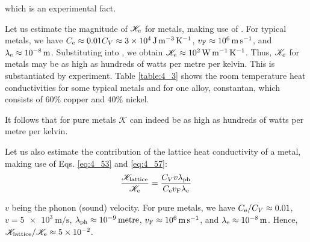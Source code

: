 \noindent
which is an experimental fact.

Let us estimate the magnitude of $\mathscr{K}_{\text{e}}$ for metals, making use of . For typical metals, we have $C_{\text{e}}\approx 0.01C_V\approx\SI{3e4}{\joule\per\metre\cubed\per\kelvin}$,
$v_{\text{F}}\approx\SI{e6}{\metre\per\second}$, and $\lambda_{\text{e}}\approx\SI{e-8}{\metre}$. Substituting into , we obtain $\mathscr{K}_{\text{e}}\approx\SI{e2}{\watt\per\metre\per\kelvin}$.
Thus, $\mathscr{K}_{\text{e}}$ for metals may be as high as hundreds of watts per metre per kelvin. This is substantiated by experiment. Table \ref{table:4_3} shows the room temperature heat conductivities for some typical metals and for one alloy, constantan, which consists of $60\%$ copper and $40\%$ nickel.

\begin{table}[!b]
	\renewcommand{\arraystretch}{1.2}
	\caption{}
	\vspace{-0.6cm}
	\label{table:4_3}
	\begin{center}\end{center}
\end{table}

It follows that for pure metals $\mathscr{K}$ can indeed be as high as hundreds of watts per metre per kelvin.

Let us also estimate the contribution of the lattice heat conductivity of a metal, making use of Eqs. \eqref{eq:4_53} and \eqref{eq:4_57}:
\begin{equation*}
    \frac{\mathscr{K}_{\text{lattice}}}{\mathscr{K}_{\text{e}}} = \frac{C_V v \lambda_{\text{ph}}}{C_{\text{e}} v_{\text{F}} \lambda_{\text{e}}}
\end{equation*}

\noindent
$v$ being the phonon (sound) velocity. For pure metals, we have $C_{\text{e}}/C_V\approx 0.01$, $v=\SI{5e3}{\metre\per\second}$, $\lambda_{\text{ph}}\approx\SI{e-9}{metre}$, $v_{\text{F}}\approx\SI{e6}{\metre\per\second}$, and $\lambda_{\text{e}}\approx\SI{e-8}{\metre}$.
Hence, $\mathscr{K}_{\text{lattice}}/\mathscr{K}_{\text{e}}\approx\num{5e-2}$.

